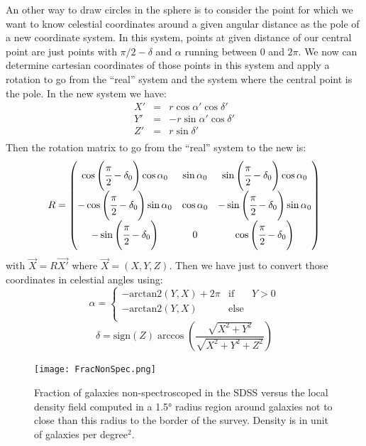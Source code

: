 An other way to draw circles in the sphere is to consider the point for which
we want to know celestial coordinates around a given angular distance as the
pole of a new coordinate system. In this system, points at given distance of
our central point are just points with $\pi/2-\delta$ and $\alpha$ running
between 0 and $2\pi$. We now can determine cartesian coordinates of
those points in this system and apply a rotation to go from the ``real'' system
and the system where the central point is the pole. In the new system we have:
%
\begin{eqnarray}
        X'&=&r\cos\alpha'\cos\delta' \nonumber\\
        Y'&=&-r\sin\alpha'\cos\delta' \nonumber\\
        Z'&=&r\sin\delta' \nonumber\\
\end{eqnarray}
%
Then the rotation matrix to go from the ``real'' system to the new is:
%
\begin{equation}
    R =
    \begin{pmatrix}
    \cos\left(\cfrac{\pi}{2}-\delta_0\right)\cos\alpha_0 & \sin\alpha_0 & \sin\left(\cfrac{\pi}{2}-\delta_0\right)\cos\alpha_0 \\
    -\cos\left(\cfrac{\pi}{2}-\delta_0\right)\sin\alpha_0 & \cos\alpha_0 & -\sin\left(\cfrac{\pi}{2}-\delta_0\right)\sin\alpha_0 \\
    -\sin\left(\cfrac{\pi}{2}-\delta_0\right) & 0 & \cos\left(\cfrac{\pi}{2}-\delta_0\right) \\
    \end{pmatrix}
\end{equation}
%
with $\vec{X}=R\vec{X'}$ where $\vec{X}=(X,Y,Z)$. Then we have just to convert
those coordinates in celestial angles using:
%
\begin{equation}
        \alpha=\left\{ \begin{array}{lcr}
                         -\mbox{arctan2}(Y,X)+2\pi & \mbox{if} & Y>0 \\
                         -\mbox{arctan2}(Y,X) & \mbox{else} & \\
                        \end{array}\right.\nonumber%
\end{equation}
%
\begin{equation}
        \delta=\mbox{sign}(Z)\arccos\left(\frac{\sqrt{X^2+Y^2}}{\sqrt{X^2+Y^2+Z^2}}\right)
\end{equation}
%
\begin{figure}[htb]
    \centering
    \texttt{[image: FracNonSpec.png]}
    \caption{Fraction of galaxies non-spectroscoped in the SDSS versus the local density field computed in a
    1.5° radius region around galaxies not to close than this radius to the border of the survey. Density is in unit of galaxies
    per degree$^2$.}
\label{fig:fracnonspec}
\end{figure}
